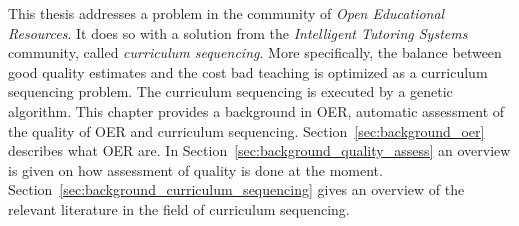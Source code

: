 This thesis addresses a problem in the community of \emph{Open Educational
Resources}. It does so with a solution from the \emph{Intelligent Tutoring
Systems} community, called \emph{curriculum sequencing}. More specifically,
the balance between good quality estimates and the cost bad teaching is
optimized as a curriculum sequencing problem. The curriculum sequencing is executed by a genetic algorithm. This chapter
provides a background in OER, automatic assessment of the quality of OER and curriculum sequencing.
Section~\ref{sec:background_oer} describes what OER are. In
Section~\ref{sec:background_quality_assess} an overview is given on how assessment of
quality is done at the moment. Section~\ref{sec:background_curriculum_sequencing} gives an overview of the
relevant literature in the field of curriculum sequencing.

